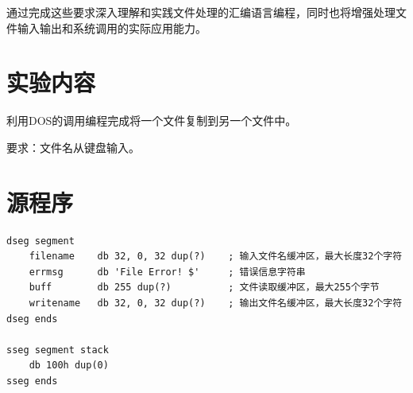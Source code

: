 \documentclass[12pt]{article}
\begin{document}
通过完成这些要求深入理解和实践文件处理的汇编语言编程，同时也将增强处理文件输入输出和系统调用的实际应用能力。
\section{实验内容}
利用DOS的调用编程完成将一个文件复制到另一个文件中。

要求：文件名从键盘输入。
\section{源程序}
    \begin{lstlisting}[caption={汇编源代码}, label=lst:asm2]
dseg segment
    filename    db 32, 0, 32 dup(?)    ; 输入文件名缓冲区，最大长度32个字符
    errmsg      db 'File Error! $'     ; 错误信息字符串
    buff        db 255 dup(?)          ; 文件读取缓冲区，最大255个字节
    writename   db 32, 0, 32 dup(?)    ; 输出文件名缓冲区，最大长度32个字符
dseg ends

sseg segment stack 
    db 100h dup(0)
sseg ends


\end{lstlisting}
\end{document}
